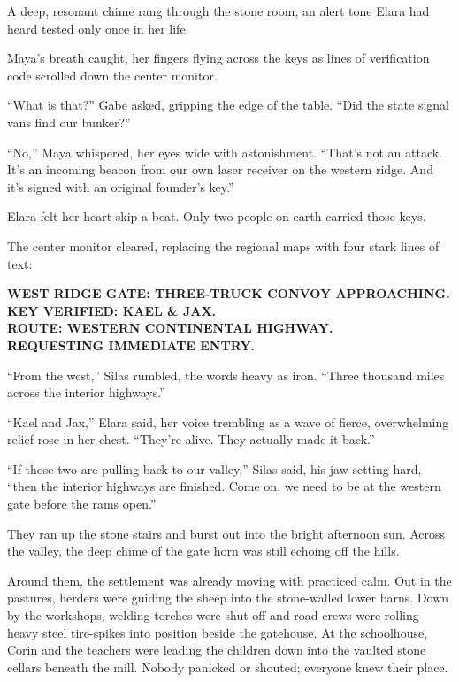 A deep, resonant chime rang through the stone room, an alert tone Elara had heard tested only once in her life. 

Maya’s breath caught, her fingers flying across the keys as lines of verification code scrolled down the center monitor.

``What is that?'' Gabe asked, gripping the edge of the table. ``Did the state signal vans find our bunker?''

``No,'' Maya whispered, her eyes wide with astonishment. ``That’s not an attack. It’s an incoming beacon from our own laser receiver on the western ridge. And it’s signed with an original founder’s key.''

Elara felt her heart skip a beat. Only two people on earth carried those keys. 

The center monitor cleared, replacing the regional maps with four stark lines of text:

\begin{center}
\textbf{WEST RIDGE GATE: THREE-TRUCK CONVOY APPROACHING.}\\
\textbf{KEY VERIFIED: KAEL \& JAX.}\\
\textbf{ROUTE: WESTERN CONTINENTAL HIGHWAY.}\\
\textbf{REQUESTING IMMEDIATE ENTRY.}
\end{center}

``From the west,'' Silas rumbled, the words heavy as iron. ``Three thousand miles across the interior highways.''

``Kael and Jax,'' Elara said, her voice trembling as a wave of fierce, overwhelming relief rose in her chest. ``They're alive. They actually made it back.''

``If those two are pulling back to our valley,'' Silas said, his jaw setting hard, ``then the interior highways are finished. Come on, we need to be at the western gate before the rams open.''

They ran up the stone stairs and burst out into the bright afternoon sun. Across the valley, the deep chime of the gate horn was still echoing off the hills. 

Around them, the settlement was already moving with practiced calm. Out in the pastures, herders were guiding the sheep into the stone-walled lower barns. Down by the workshops, welding torches were shut off and road crews were rolling heavy steel tire-spikes into position beside the gatehouse. At the schoolhouse, Corin and the teachers were leading the children down into the vaulted stone cellars beneath the mill. Nobody panicked or shouted; everyone knew their place.

